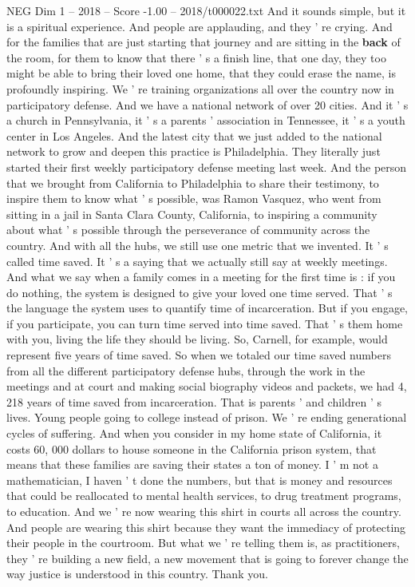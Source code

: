 \begin{textsample}{NEG Dim 1 – 2018 – Score -1.00 – 2018/t000022.txt}
And it sounds simple, but it is a spiritual experience.
And people are applauding, and they ' re crying.
And for the families that are just starting that journey and are sitting in the \textbf{back} of the room, for them to know that there ' s a finish line, that one day, they too might be able to bring their loved one home, that they could erase the name, is profoundly inspiring.
We ' re training organizations all over the country now in participatory defense.
And we have a national network of over 20 cities.
And it ' s a church in Pennsylvania, it ' s a parents ' association in Tennessee, it ' s a youth center in Los Angeles.
And the latest city that we just added to the national network to grow and deepen this practice is Philadelphia.
They literally just started their first weekly participatory defense meeting last week.
And the person that we brought from California to Philadelphia to share their testimony, to inspire them to know what ' s possible, was Ramon Vasquez, who went from sitting in a jail in Santa Clara County, California, to inspiring a community about what ' s possible through the perseverance of community across the country.
And with all the hubs, we still use one metric that we invented.
It ' s called time saved.
It ' s a saying that we actually still say at weekly meetings.
And what we say when a family comes in a meeting for the first time is : if you do nothing, the system is designed to give your loved one time served.
That ' s the language the system uses to quantify time of incarceration.
But if you engage, if you participate, you can turn time served into time saved.
That ' s them home with you, living the life they should be living.
So, Carnell, for example, would represent five years of time saved.
So when we totaled our time saved numbers from all the different participatory defense hubs, through the work in the meetings and at court and making social biography videos and packets, we had 4, 218 years of time saved from incarceration.
That is parents ' and children ' s lives.
Young people going to college instead of prison.
We ' re ending generational cycles of suffering.
And when you consider in my home state of California, it costs 60, 000 dollars to house someone in the California prison system, that means that these families are saving their states a ton of money.
I ' m not a mathematician, I haven ' t done the numbers, but that is money and resources that could be reallocated to mental health services, to drug treatment programs, to education.
And we ' re now wearing this shirt in courts all across the country.
And people are wearing this shirt because they want the immediacy of protecting their people in the courtroom.
But what we ' re telling them is, as practitioners, they ' re building a new field, a new movement that is going to forever change the way justice is understood in this country.
Thank you.

\end{textsample}
